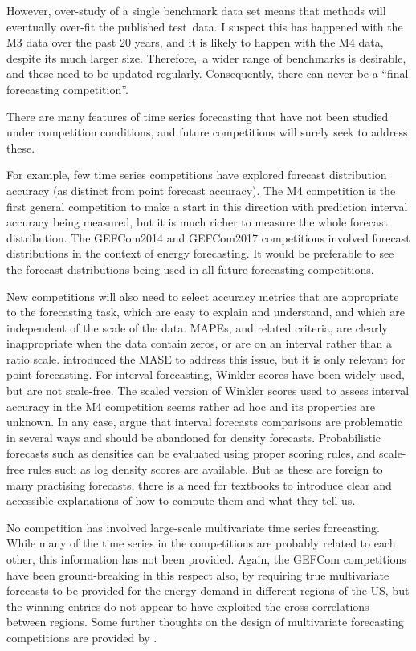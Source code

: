 \documentclass[11pt,a4paper,]{article}
\begin{document}
However, over-study of a single benchmark data set means that methods will eventually over-fit the published test~data. I suspect this has happened with the M3 data over the past 20 years, and it is likely to happen with the M4 data, despite its much larger size. Therefore,~a wider range of benchmarks is desirable, and these need to be updated regularly. Consequently, there can never be a ``final forecasting competition''.

There are many features of time series forecasting that have not been studied under competition conditions, and future competitions will surely seek to address these.

For example, few time series competitions have explored forecast distribution accuracy (as distinct from point forecast accuracy). The M4 competition is the first general competition to make a start in this direction with prediction interval accuracy being measured, but it is much richer to measure the whole forecast distribution. The GEFCom2014 and GEFCom2017 competitions involved forecast distributions in the context of energy forecasting. It would be preferable to see the forecast distributions being used in all future forecasting competitions.

New competitions will also need to select accuracy metrics that are appropriate to the forecasting task, which are easy to explain and understand, and which are independent of the scale of the data. MAPEs, and related criteria, are clearly inappropriate when the data contain zeros, or are on an interval rather than a ratio scale. \textcite{HK06} introduced the MASE to address this issue, but it is only relevant for point forecasting. For interval forecasting, Winkler scores \autocite{Winkler1972} have been widely used, but are not scale-free. The scaled version of Winkler scores used to assess interval accuracy in the M4 competition seems rather ad hoc and its properties are unknown. In any case, \textcite{Askanazi2018} argue that interval forecasts comparisons are problematic in several ways and should be abandoned for density forecasts. Probabilistic forecasts such as densities can be evaluated using proper scoring rules, and scale-free rules such as log density scores are available. But as these are foreign to many practising forecasts, there is a need for textbooks to introduce clear and accessible explanations of how to compute them and what they tell us.

No competition has involved large-scale multivariate time series forecasting. While many of the time series in the competitions are probably related to each other, this information has not been provided. Again, the GEFCom competitions have been ground-breaking in this respect also, by requiring true multivariate forecasts to be provided for the energy demand in different regions of the US, but the winning entries do not appear to have exploited the cross-correlations between regions. Some further thoughts on the design of multivariate forecasting competitions are provided by \textcite{FildesOrd2002}.
\end{document}
